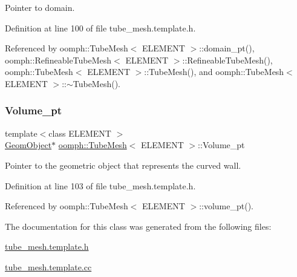 Pointer to domain. 



Definition at line 100 of file tube\+\_\+mesh.\+template.\+h.



Referenced by oomph\+::\+Tube\+Mesh$<$ E\+L\+E\+M\+E\+N\+T $>$\+::domain\+\_\+pt(), oomph\+::\+Refineable\+Tube\+Mesh$<$ E\+L\+E\+M\+E\+N\+T $>$\+::\+Refineable\+Tube\+Mesh(), oomph\+::\+Tube\+Mesh$<$ E\+L\+E\+M\+E\+N\+T $>$\+::\+Tube\+Mesh(), and oomph\+::\+Tube\+Mesh$<$ E\+L\+E\+M\+E\+N\+T $>$\+::$\sim$\+Tube\+Mesh().

\mbox{\label{classoomph_1_1TubeMesh_a3b89c07eff15d0eb9d5fe9e0c93f8ec2}} 
\subsubsection{\texorpdfstring{Volume\+\_\+pt}{Volume\_pt}}
{\footnotesize\ttfamily template$<$class E\+L\+E\+M\+E\+NT $>$ \\
\hyperlink{classoomph_1_1GeomObject}{Geom\+Object}$\ast$ \hyperlink{classoomph_1_1TubeMesh}{oomph\+::\+Tube\+Mesh}$<$ E\+L\+E\+M\+E\+NT $>$\+::Volume\+\_\+pt\hspace{0.3cm}{\ttfamily [protected]}}



Pointer to the geometric object that represents the curved wall. 



Definition at line 103 of file tube\+\_\+mesh.\+template.\+h.



Referenced by oomph\+::\+Tube\+Mesh$<$ E\+L\+E\+M\+E\+N\+T $>$\+::volume\+\_\+pt().



The documentation for this class was generated from the following files\+:\begin{DoxyCompactItemize}
\item 
\hyperlink{tube__mesh_8template_8h}{tube\+\_\+mesh.\+template.\+h}\item 
\hyperlink{tube__mesh_8template_8cc}{tube\+\_\+mesh.\+template.\+cc}\end{DoxyCompactItemize}

